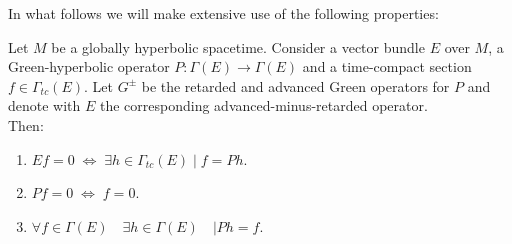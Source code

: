 \documentclass[Main]{subfiles}
\begin{document}
			In what follows we will make extensive use of the following properties:
			\begin{proposition}\label{Prop:GreenKernel}
				Let $M$ be a globally hyperbolic spacetime. Consider a vector bundle $E$ over $M$, a Green-hyperbolic operator $P: \Gamma(E)\rightarrow \Gamma(E)$ and a time-compact section $f\in \Gamma_{tc}(E)$.
				Let $G^\pm$ be the retarded and advanced Green operators for $P$ and denote with $E$ the corresponding advanced-minus-retarded operator.\\
				Then:
					\begin{enumerate}
						\item $E f = 0 \; \Leftrightarrow \; \exists h \in \Gamma_{tc}(E) \; \vert \; f=P h $.
						\item $P f = 0 \; \Leftrightarrow \; f=0$.
						\item $\forall f \in \Gamma(E)\quad \exists h \in \Gamma(E)\quad \vert P h = f$.
					\end{enumerate}
			\end{proposition}
\end{document}
